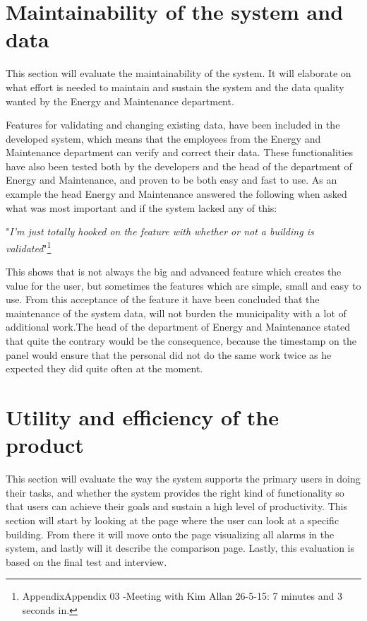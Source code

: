 \section*{Maintainability of the system and data}
This section will evaluate the maintainability of the system. It will elaborate on what effort is needed to maintain and sustain the system and the data quality wanted by the Energy and Maintenance department.   

Features for validating and changing existing data, have been included in the developed system, which means that the employees from the Energy and Maintenance department can verify and correct their data. These functionalities have also been tested both by the developers and the head of the department of Energy and Maintenance, and proven to be both easy and fast to use. As an example the head Energy and Maintenance answered the following when asked what was most important and if the system lacked any of this:
\begin{center}
"\emph{I’m just totally hooked on the feature with whether or not a building is validated}"\footnote{AppendixAppendix 03 -Meeting with Kim Allan 26-5-15: 7 minutes and 3 seconds in.}
\end{center}
This shows that is not always the big and advanced feature which creates the value for the user, but sometimes the features which are simple, small and easy to use. From this acceptance of the feature it have been concluded that the maintenance of the system data, will not burden the municipality with a lot of additional work.The head of the department of Energy and Maintenance stated that quite the contrary would be the consequence, because the timestamp on the panel would ensure that the personal did not do the same work twice as he expected they did quite often at the moment.
\section{Utility and efficiency of the product}
This section will evaluate the way the system supports the primary users in doing their tasks, and whether the system provides the right kind of functionality so that users can achieve their goals and sustain a high level of productivity. This section will start by looking at the page where the user can look at a specific building. From there it will move onto the page visualizing all alarms in the system, and lastly will it describe the comparison page. Lastly, this evaluation is based on the final test and interview.
